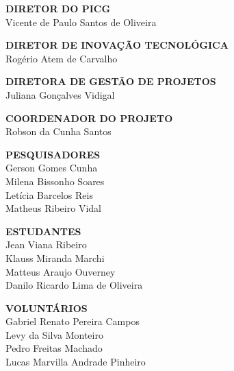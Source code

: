 \begin{center}
    \newpage

    \vfill
    \textbf{DIRETOR DO PICG}\\
    Vicente de Paulo Santos de Oliveira
    \vfill
    
    \textbf{DIRETOR DE INOVAÇÃO TECNOLÓGICA}\\
    Rogério Atem de Carvalho
    \vfill
    
    \textbf{DIRETORA DE GESTÃO DE PROJETOS}\\
    Juliana Gonçalves Vidigal
    \vfill
    
    \textbf{COORDENADOR DO PROJETO}\\
    Robson da Cunha Santos
    \vfill
    
    \textbf{PESQUISADORES}\\
    Gerson Gomes Cunha\\
    Milena Bissonho Soares\\
    Letícia Barcelos Reis \\
    Matheus Ribeiro Vidal
    \vfill
    
    \textbf{ESTUDANTES}\\
    Jean Viana Ribeiro \\
    Klauss Miranda Marchi \\
    Matteus Araujo Ouverney\\
    Danilo Ricardo Lima de Oliveira
    \vfill

    \textbf{VOLUNTÁRIOS}\\
    Gabriel Renato Pereira Campos\\
    Levy da Silva Monteiro\\
    Pedro Freitas Machado\\
    Lucas Marvilla Andrade Pinheiro
    \vfill
\end{center}